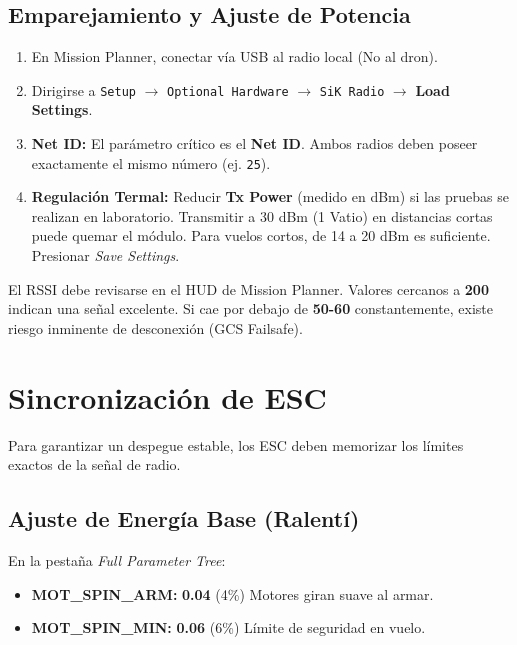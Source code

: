 \documentclass[11pt,a4paper]{article}
\begin{document}
\subsection{Emparejamiento y Ajuste de Potencia}
\begin{enumerate}[leftmargin=*,noitemsep]
    \item En Mission Planner, conectar vía USB al radio local (No al dron).
    \item Dirigirse a \texttt{Setup} $\rightarrow$ \texttt{Optional Hardware} $\rightarrow$ \texttt{SiK Radio} $\rightarrow$ \textbf{Load Settings}.
    \item \textbf{Net ID:} El parámetro crítico es el \textbf{Net ID}. Ambos radios deben poseer exactamente el mismo número (ej. \texttt{25}).
    \item \textbf{Regulación Termal:} Reducir \textbf{Tx Power} (medido en dBm) si las pruebas se realizan en laboratorio. Transmitir a 30 dBm (1 Vatio) en distancias cortas puede quemar el módulo. Para vuelos cortos, de 14 a 20 dBm es suficiente. Presionar \textit{Save Settings}.
\end{enumerate}

\begin{infobox}[title=Monitoreo del Enlace (RSSI)]
El RSSI debe revisarse en el HUD de Mission Planner. Valores cercanos a \textbf{200} indican una señal excelente. Si cae por debajo de \textbf{50-60} constantemente, existe riesgo inminente de desconexión (GCS Failsafe).
\end{infobox}

\section{Sincronización de ESC}
Para garantizar un despegue estable, los ESC deben memorizar los límites exactos de la señal de radio.

\subsection{Ajuste de Energía Base (Ralentí)}
En la pestaña \textit{Full Parameter Tree}:
\begin{itemize}[leftmargin=*,noitemsep]
    \item \textbf{MOT\_SPIN\_ARM:} \textbf{0.04} (4\%) Motores giran suave al armar.
    \item \textbf{MOT\_SPIN\_MIN:} \textbf{0.06} (6\%) Límite de seguridad en vuelo.
\end{itemize}
\end{document}

